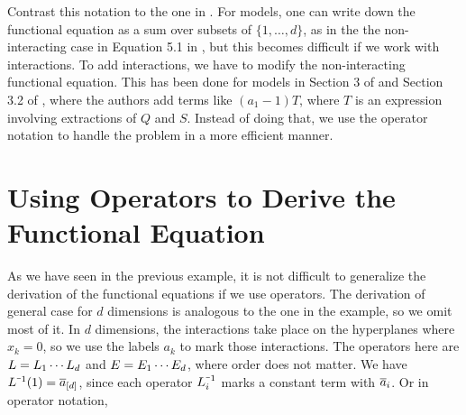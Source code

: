 Contrast this notation to the one in \cite[p.~10]{bousquet2010walks}. For \dD models, one can write down the functional equation as a sum over subsets of $\{1,\ldots, d\}$, as in the the non-interacting case in Equation 5.1 in \cite[p.~58]{melczer2014variants}, but this becomes difficult if we work with interactions. To add interactions, we have to modify the non-interacting functional equation. This has been done for \twoD models in Section 3 of \cite[p.~7]{tabbara2014exact} and Section 3.2 of \cite[p.~11]{wong2014confining}, where the authors add terms like $(a_1-1)T$, where $T$ is an expression involving extractions of $Q$ and $S$. Instead of doing that, we use the operator notation to handle the problem in a more efficient manner.
\section{Using Operators to Derive the Functional Equation}

As we have seen in the previous example, it is not difficult to generalize the derivation of the functional equations if we use operators. The derivation of general case for $d$ dimensions is analogous to the one in the example, so we omit most of it. In $d$ dimensions, the interactions take place on the hyperplanes where $x_k = 0$, so we use the labels $a_k$ to mark those interactions. The operators here are $L = L_1\cdots L_d$ and $E = E_1\cdots E_d$, where order does not matter.  We have $L^{\um 1}(1) = \ol a_{[d]}$, since each operator $L_i^{\um 1}$ marks a constant term with $\overline{a}_i$. Or in operator notation,

